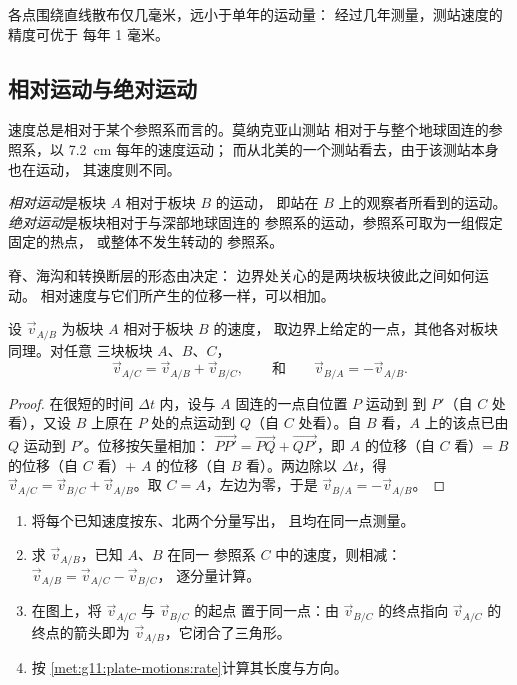 各点围绕直线散布仅几毫米，远小于单年的运动量：
经过几年测量，测站速度的精度可优于
每年 1 毫米。

\subsection{相对运动与绝对运动}

速度总是相对于某个参照系而言的。莫纳克亚山测站
相对于与整个地球固连的参照系，以 \qty{7.2}{cm} 每年的速度运动；
而从北美的一个测站看去，由于该测站本身也在运动，
其速度则不同。

\begin{definition}\label{def:g11:plate-motions:relative-motion}
\emph{相对运动}是板块 $A$ 相对于板块 $B$ 的运动，
即站在 $B$ 上的观察者所看到的运动。
\emph{绝对运动}是板块相对于与深部地球固连的
参照系的运动，参照系可取为一组假定固定的热点，
或整体不发生转动的
参照系。
\end{definition}

脊、海沟和转换断层的形态由决定：
边界处关心的是两块板块彼此之间如何运动。
相对速度与它们所产生的位移一样，可以相加。

\begin{proposition}[相对速度如矢量般相加]\label{prop:g11:plate-motions:sum}
设 $\vec v_{A/B}$ 为板块 $A$ 相对于板块 $B$ 的速度，
取边界上给定的一点，其他各对板块同理。对任意
三块板块 $A$、$B$、$C$，
\[
  \vec v_{A/C} = \vec v_{A/B} + \vec v_{B/C},
  \qquad\text{和}\qquad
  \vec v_{B/A} = -\vec v_{A/B}.
\]
\end{proposition}

\begin{proof}
在很短的时间 $\Delta t$ 内，设与 $A$ 固连的一点自位置 $P$ 运动到
到 $P'$（自 $C$ 处看），又设 $B$ 上原在 $P$ 处的点运动到
$Q$（自 $C$ 处看）。自 $B$ 看，$A$ 上的该点已由 $Q$ 运动到
$P'$。位移按矢量相加：
$\overrightarrow{PP'} = \overrightarrow{PQ} + \overrightarrow{QP'}$，即
$A$ 的位移（自 $C$ 看）= $B$ 的位移（自 $C$ 看）+
$A$ 的位移（自 $B$ 看）。两边除以 $\Delta t$，得 $\vec v_{A/C}
= \vec v_{B/C} + \vec v_{A/B}$。取 $C = A$，左边为零，于是 $\vec
v_{B/A} = -\vec v_{A/B}$。
\end{proof}

\begin{method}[闭合速度三角形]\label{met:g11:plate-motions:triangle}
\begin{enumerate}
  \item 将每个已知速度按东、北两个分量写出，
        且均在同一点测量。
  \item 求 $\vec v_{A/B}$，已知 $A$、$B$ 在同一
        参照系 $C$ 中的速度，则相减：$\vec v_{A/B} = \vec v_{A/C} - \vec v_{B/C}$，
        逐分量计算。
  \item 在图上，将 $\vec v_{A/C}$ 与 $\vec v_{B/C}$ 的起点
        置于同一点：由 $\vec v_{B/C}$ 的终点指向
        $\vec v_{A/C}$ 的终点的箭头即为 $\vec v_{A/B}$，它闭合了三角形。
  \item 按
        \cref{met:g11:plate-motions:rate}计算其长度与方向。
\end{enumerate}
\end{method}

